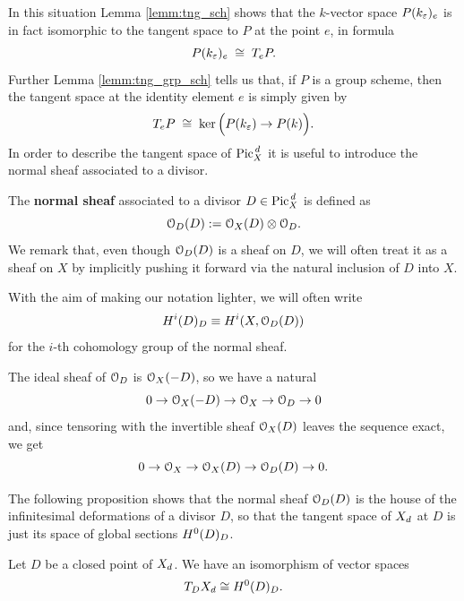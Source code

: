 	In this situation Lemma \ref{lemm:tng_sch} shows that the $k$-vector space $P(k_\varepsilon)_e$ is in fact isomorphic to the tangent space to $P$ at the point $e$, in formula
	$$ P(k_\varepsilon)_e \; \cong \; T_e P. $$
	Further Lemma \ref{lemm:tng_grp_sch} tells us that, if $P$ is a group scheme, then the tangent space at the identity element $e$ is simply given by
	$$ T_e P \;\cong\; \ker \Big( P(k_\varepsilon) \to P(k) \Big). $$
	In order to describe the tangent space of $ \operatorname{Pic}^{\,d}_X$ it is useful to introduce the normal sheaf associated to a divisor.
	\begin{defi}
		The \textbf{normal sheaf} associated to a divisor $D\in  \operatorname{Pic}^{\,d}_X$ is defined as
		$$ \mathcal{O}_D(D) := \mathcal{O}_X(D) \otimes \mathcal{O}_D. $$
		We remark that, even though $\mathcal{O}_D(D)$ is a sheaf on $D$, we will often treat it as a sheaf on $X$ by implicitly pushing it forward via the natural inclusion of $D$ into $X$. 
	\end{defi}
	\begin{notation}
		With the aim of making our notation lighter, we will often write 
		$$ H^i(D)_{D} \equiv H^i(X,\mathcal{O}_D(D))$$ 
		for the $i$-th cohomology group of the normal sheaf.
	\end{notation}
	\begin{rema}\label{rema:div_ses}
		The ideal sheaf of $\mathcal{O}_D$ is $\mathcal{O}_X(-D)$, so we have a natural \ses
		$$ 0 \to \mathcal{O}_X(-D) \to \mathcal{O}_X \to \mathcal{O}_D \to 0 $$
		and, since tensoring with the invertible sheaf $\mathcal{O}_X(D)$ leaves the sequence exact, we get
		$$ 0 \to \mathcal{O}_X \to \mathcal{O}_X(D) \to \mathcal{O}_D(D) \to 0. $$			
	\end{rema}
	The following proposition shows that the normal sheaf $\mathcal{O}_D(D)$ is the house of the infinitesimal deformations of a divisor $D$, so that the tangent space of $X_d$ at $D$ is just its space of global sections $H^0(D)_D$.
	\begin{prop}\label{prop:tgn_div}
		Let $D$ be a closed point of $ X_d$. We have an isomorphism of vector spaces
		$$ T_D X_d \cong H^0(D)_D. $$
	\end{prop}
